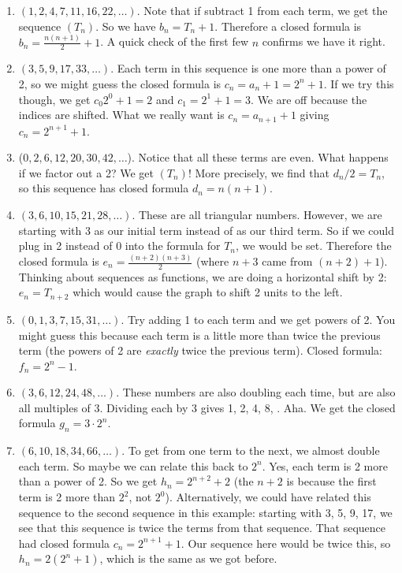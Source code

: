 \documentclass[11pt,]{book}
\theoremstyle{ptxplainnotitle}
\theoremstyle{ptxplaintitle}
\theoremstyle{ptxdefinitionnotitle}
\theoremstyle{ptxdefinitiontitle}
\theoremstyle{ptxdefinitionnotitle}
\theoremstyle{ptxdefinitiontitle}
\theoremstyle{ptxdefinitionnotitle}
\theoremstyle{ptxdefinitiontitle}
\theoremstyle{ptxdefinitiontitlenonumber}
\theoremstyle{ptxdefinitiontitlenonumber}
\numberwithin{equation}{chapter}
\begin{document}
\begin{example}
\begin{enumerate}
\item\hypertarget{li-42}{}\hypertarget{p-71}{}%
\((1, 2, 4, 7, 11, 16, 22, \ldots)\). Note that if subtract 1 from each term, we get the sequence \((T_n)\). So we have \(b_n = T_n + 1\). Therefore a closed formula is \(b_n = \frac{n(n+1)}{2} + 1\). A quick check of the first few \(n\) confirms we have it right.%
\item\hypertarget{li-43}{}\hypertarget{p-72}{}%
\((3, 5, 9, 17, 33, \ldots )\). Each term in this sequence is one more than a power of 2, so we might guess the closed formula is \(c_n = a_n+1 = 2^n + 1\). If we try this though, we get \(c_0 2^0 + 1 = 2\) and \(c_1 = 2^1 + 1 = 3\). We are off because the indices are shifted.  What we really want is \(c_n = a_{n+1}+1\) giving  \(c_n = 2^{n+1} + 1\).%
\item\hypertarget{li-44}{}\hypertarget{p-73}{}%
(\(0, 2, 6, 12, 20, 30, 42,\ldots \)). Notice that all these terms are even. What happens if we factor out a 2? We get \((T_n)\)! More precisely, we find that \(d_n/2 = T_n\), so this sequence has closed formula \(d_n = n(n+1)\).%
\item\hypertarget{li-45}{}\hypertarget{p-74}{}%
\((3, 6, 10, 15, 21, 28, \ldots)\). These are all triangular numbers. However, we are starting with 3 as our initial term instead of as our third term. So if we could plug in 2 instead of 0 into the formula for \(T_n\), we would be set. Therefore the closed formula is \(e_n = \frac{(n+2)(n+3)}{2}\) (where \(n+3\) came from \((n+2)+1\)).  Thinking about sequences as functions, we are doing a horizontal shift by 2: \(e_n = T_{n+2}\) which would cause the graph to shift 2 units to the left.%
\item\hypertarget{li-46}{}\hypertarget{p-75}{}%
\((0, 1, 3, 7, 15, 31, \ldots )\). Try adding 1 to each term and we get powers of 2. You might guess this because each term is a little more than twice the previous term (the powers of 2 are \emph{exactly} twice the previous term). Closed formula: \(f_n = 2^{n} - 1\).%
\item\hypertarget{li-47}{}\hypertarget{p-76}{}%
\((3, 6, 12, 24, 48, \ldots )\). These numbers are also doubling each time, but are also all multiples of 3. Dividing each by 3   gives 1, 2, 4, 8, \textellipsis{}. Aha. We get the closed formula \(g_n = 3\cdot 2^{n}\).%
\item\hypertarget{li-48}{}\hypertarget{p-77}{}%
\((6, 10, 18, 34, 66, \ldots )\). To get from one term to the next, we almost double each term. So maybe we can relate this back to \(2^n\). Yes, each term is 2 more than a power of 2. So we get \(h_n = 2^{n+2} + 2\) (the \(n+2\) is because the first term is 2 more than \(2^2\), not \(2^0\)). Alternatively, we could have related this sequence to the second sequence in this example: starting with 3, 5, 9, 17, \textellipsis{} we see that this sequence is twice the terms from that sequence. That sequence had closed formula \(c_n = 2^{n+1} + 1\). Our sequence here would be twice this, so \(h_n = 2(2^n + 1)\), which is the same as we got before.%

\end{enumerate}
\end{example}
\end{document}
